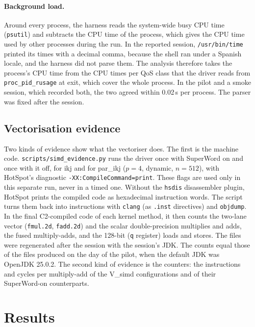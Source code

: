 \documentclass[11pt,a4paper]{article}
\begin{document}
\paragraph{Background load.} Around every process, the harness reads the
system-wide busy CPU time (\texttt{psutil}) and subtracts the CPU time of the
process, which gives the CPU time used by other processes during the run. In
the reported session, \texttt{/usr/bin/time} printed its times with a decimal
comma, because the shell ran under a Spanish locale, and the harness did not
parse them. The analysis therefore takes the process's CPU time from the CPU
times per QoS class that the driver reads from \texttt{proc\_pid\_rusage} at
exit, which cover the whole process. In the pilot and a smoke session, which
recorded both, the two agreed within 0.02\,s per process. The parser was fixed
after the session.

\subsection{Vectorisation evidence}

Two kinds of evidence show what the vectoriser does. The first is the machine
code. \texttt{scripts/simd\_evidence.py} runs the driver once with SuperWord on
and once with it off, for ikj and for par\_ikj ($p=4$, dynamic, $n=512$), with
HotSpot's diagnostic \texttt{-XX:CompileCommand=print}. These flags are used
only in this separate run, never in a timed one. Without the \texttt{hsdis}
disassembler plugin, HotSpot prints the compiled code as hexadecimal
instruction words. The script turns them back into instructions with
\texttt{clang} (as \texttt{.inst} directives) and \texttt{objdump}. In the
final C2-compiled code of each kernel method, it then counts the two-lane
vector (\texttt{fmul.2d}, \texttt{fadd.2d}) and the scalar double-precision
multiplies and adds, the fused multiply-adds, and the 128-bit (\texttt{q}
register) loads and stores. The files were regenerated after the session with
the session's JDK. The counts equal those of the files produced on the day of
the pilot, when the default JDK was OpenJDK 25.0.2. The second kind of evidence is the counters: the
instructions and cycles per multiply-add of the V\_simd configurations and of
their SuperWord-on counterparts.

\section{Results}
\label{sec:results}
\end{document}
